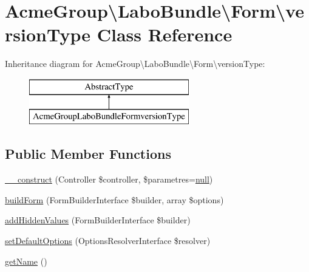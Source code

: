 \hypertarget{class_acme_group_1_1_labo_bundle_1_1_form_1_1version_type}{\section{Acme\+Group\textbackslash{}Labo\+Bundle\textbackslash{}Form\textbackslash{}version\+Type Class Reference}
\label{class_acme_group_1_1_labo_bundle_1_1_form_1_1version_type}
}
Inheritance diagram for Acme\+Group\textbackslash{}Labo\+Bundle\textbackslash{}Form\textbackslash{}version\+Type\+:\begin{figure}[H]
\begin{center}
\leavevmode
\includegraphics[height=2.000000cm]{class_acme_group_1_1_labo_bundle_1_1_form_1_1version_type}
\end{center}
\end{figure}
\subsection*{Public Member Functions}
\begin{DoxyCompactItemize}
\item 
\hyperlink{class_acme_group_1_1_labo_bundle_1_1_form_1_1version_type_ac58dc50488b2a6ee5ba8dd4c19d5c39e}{\+\_\+\+\_\+construct} (Controller \$controller, \$parametres=\hyperlink{validate_8js_afb8e110345c45e74478894341ab6b28e}{null})
\item 
\hyperlink{class_acme_group_1_1_labo_bundle_1_1_form_1_1version_type_a7768fb262be987d40a0c3f260096c529}{build\+Form} (Form\+Builder\+Interface \$builder, array \$options)
\item 
\hyperlink{class_acme_group_1_1_labo_bundle_1_1_form_1_1version_type_a28f6b8d48eaf5c968293bf502b5e5369}{add\+Hidden\+Values} (Form\+Builder\+Interface \$builder)
\item 
\hyperlink{class_acme_group_1_1_labo_bundle_1_1_form_1_1version_type_a21e3de7570e7ea376122653f80708eb5}{set\+Default\+Options} (Options\+Resolver\+Interface \$resolver)
\item 
\hyperlink{class_acme_group_1_1_labo_bundle_1_1_form_1_1version_type_a8afe78b2d8dcb25a563d82e3c30ced7d}{get\+Name} ()
\end{DoxyCompactItemize}


